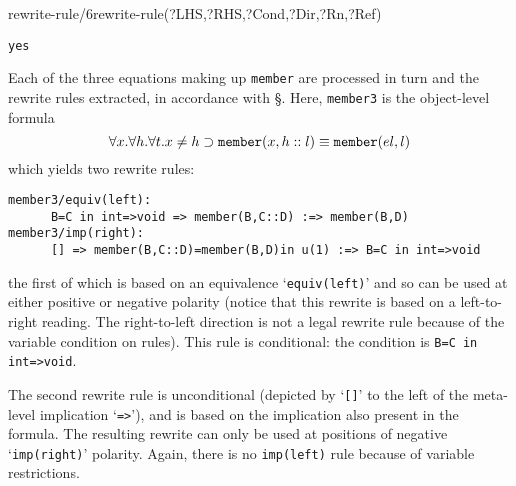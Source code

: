 \begin{predicate}{rewrite-rule/6}{rewrite-rule(?LHS,?RHS,?Cond,?Dir,?Rn,?Ref)}
\begin{example}
\begin{verbatim}
yes
\end{verbatim}
Each of the three equations making up {\tt member} are processed in
turn and the rewrite rules extracted, in accordance with
\S{}.   Here, {\tt member3} is the 
object-level formula
\[
\forall x.\forall h.\forall t.x\not =h\supset {\tt
member}(x,h::l)\equiv {\tt member}(el,l)
\]
which yields two rewrite rules:
\begin{verbatim}
member3/equiv(left):
      B=C in int=>void => member(B,C::D) :=> member(B,D)
member3/imp(right):
      [] => member(B,C::D)=member(B,D)in u(1) :=> B=C in int=>void
\end{verbatim}
the first of which is based on an equivalence `{\tt equiv(left)}' and so can be used at
either positive or negative polarity (notice that this rewrite is based 
on a left-to-right reading.  The right-to-left direction 
is not a legal rewrite rule because of the variable condition on
rules).    This rule is conditional: the condition is {\tt B=C in int=>void}.

The second rewrite rule is unconditional (depicted by `{\tt []}' to
the left of the meta-level implication `{\tt =>}'), and is based on the
implication also present in the formula.  The resulting rewrite can
only be used at positions of negative `{\tt imp(right)}' polarity.
Again, there is no {\tt imp(left)} rule because of variable restrictions.
\end{example}

\end{predicate}

